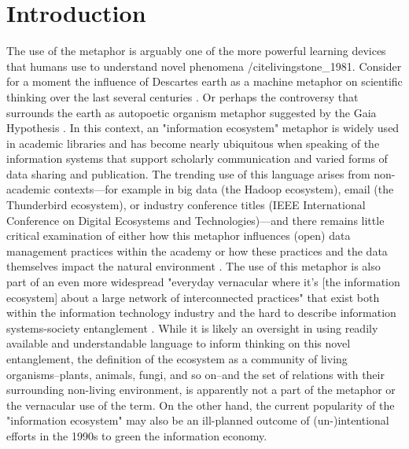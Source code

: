 \section{Introduction}

The use of the metaphor is arguably one of the more powerful learning devices that humans use to understand novel phenomena /cite{livingstone_1981}. Consider for a moment the influence of Descartes earth as a machine metaphor on scientific thinking over the last several centuries \cite{abram_1991}. Or perhaps the controversy that surrounds the earth as autopoetic organism metaphor suggested by the Gaia Hypothesis \cite{kirchner_1991, abram_1991}. In this context, an "information ecosystem" metaphor is widely used in academic libraries and has become nearly ubiquitous when speaking of the information systems that support scholarly communication and varied forms of data sharing and publication. The trending use of this language arises from non-academic contexts—for example in big data (the Hadoop ecosystem), email (the Thunderbird ecosystem), or industry conference titles (IEEE International Conference on Digital Ecosystems and Technologies)—and there remains little critical examination of either how this metaphor influences (open) data management practices within the academy or how these practices and the data themselves impact the natural environment \cite[although see][]{stepp_1999}. The use of this metaphor is also part of an even more widespread "everyday vernacular where it’s [the information ecosystem] about a large network of interconnected practices" that exist both within the information technology industry and the hard to describe information systems-society entanglement \cite{boyd_2016}. While it is likely an oversight in using readily available and understandable language to inform thinking on this novel entanglement, the definition of the ecosystem as a community of living organisms--plants, animals, fungi, and so on--and the set of relations with their surrounding non-living environment, is apparently not a part of the metaphor or the vernacular use of the term. On the other hand, the current popularity of the "information ecosystem" may also be an ill-planned outcome of (un-)intentional efforts in the 1990s to green the information economy.

